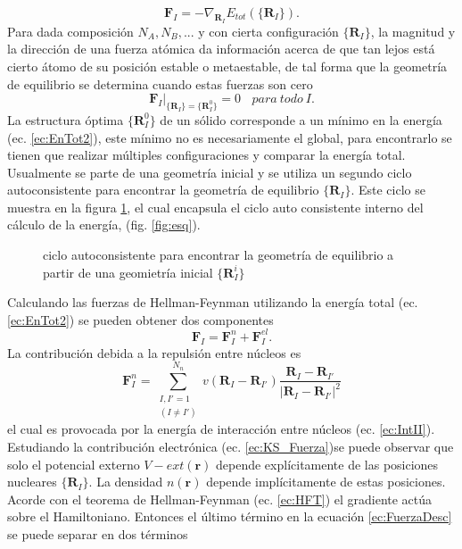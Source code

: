 \documentclass[12pt,a4paper, oneside]{book}
\begin{document}
   \begin{equation}
   \pmb{F}_I = - \nabla_{\pmb{R}_I} E_{tot} (\{\pmb{R}_I\}). \label{ec:Fuerza_Et}
   \end{equation}
   Para dada composici\'on $N_A,N_B, ...$ y con cierta configuraci\'on $\{\pmb{R}_I\}$, la magnitud y la direcci\'on de una fuerza at\'omica da informaci\'on acerca de que tan lejos est\'a cierto \'atomo de su posici\'on estable o metaestable, de tal forma que la geometr\'ia de equilibrio se determina cuando estas fuerzas son cero
   \begin{equation}
   \pmb{F}_I |_{\{\pmb{R}_I\}= \{\pmb{R}_I^0\}} = 0 ~~~~para~ todo~ I .\label{ec:fuerzaEq}
   \end{equation}
   La estructura \'optima $\{\pmb{R}_I^0\}$ de un s\'olido corresponde a un m\'inimo en la energ\'ia (ec. \ref{ec:EnTot2}), este m\'inimo no es necesariamente el global, para encontrarlo se tienen que realizar m\'ultiples configuraciones y comparar la energ\'ia total. Usualmente se parte de una geometr\'ia inicial y se utiliza un segundo ciclo autoconsistente para encontrar la geometr\'ia de equilibrio $\{\pmb{R}_I\}$. Este ciclo se muestra en la figura \ref{fig:esqFuerza}, el cual encapsula el ciclo auto consistente interno del c\'alculo de la energ\'ia, (fig. \ref{fig:esq}).
   \begin{figure}[!hbt]
   	\centering
   	\caption{ciclo autoconsistente para encontrar la geometr\'ia de equilibrio a partir de una geomietr\'ia inicial $\{\pmb{R}_I^i\} $}
   	\label{fig:esqFuerza}
   \end{figure}
   \newline
   Calculando las fuerzas de Hellman-Feynman utilizando la energ\'ia total (ec. \ref{ec:EnTot2}) se pueden obtener dos componentes
   \begin{equation}
   	\pmb{F}_I = \pmb{F}_I^n + \pmb{F}_I^{el}. \label{ec:FuerzaDesc}
   \end{equation}
   La contribuci\'on debida a la repulsi\'on entre n\'ucleos es
   \begin{equation}
   \pmb{F}_I^n = \sum_{\substack{I,I' = 1 \\ (I \not = I')}}^{N_n} v(\pmb{R}_I - \pmb{R}_{I'}) \frac{\pmb{R}_I - \pmb{R}_{I'}}{|\pmb{R}_I - \pmb{R}_{I'}|^2}
   \end{equation}
   el cual es provocada por la energ\'ia de interacci\'on entre n\'ucleos (ec. \ref{ec:IntII}). Estudiando la contribuci\'on electr\'onica  (ec. \ref{ec:KS_Fuerza})se puede observar que solo el potencial externo $V-{ext} (\pmb{r})$ depende expl\'icitamente de las posiciones nucleares $\{\pmb{R}_I\}$. La densidad $n(\pmb{r})$ depende impl\'icitamente de estas posiciones. Acorde con el teorema de Hellman-Feynman (ec. \ref{ec:HFT}) el gradiente act\'ua sobre el Hamiltoniano. Entonces el \'ultimo t\'ermino en la ecuaci\'on \ref{ec:FuerzaDesc} se puede separar en dos t\'erminos
\end{document}
